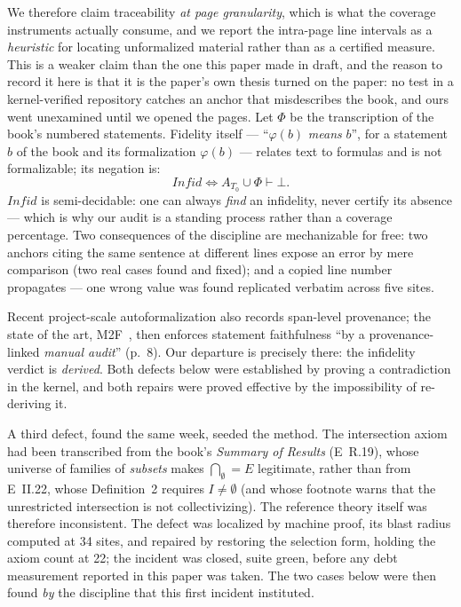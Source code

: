 \documentclass[11pt]{article}
\theoremstyle{remark}\newtheorem{example}{Example}
\begin{document}
We therefore claim traceability \emph{at page granularity}, which is what the coverage
instruments actually consume, and we report the intra-page line intervals as a
\emph{heuristic} for locating unformalized material rather than as a certified measure.
This is a weaker claim than the one this paper made in draft, and the reason to record
it here is that it is the paper's own thesis turned on the paper: no test in a
kernel-verified repository catches an anchor that misdescribes the book, and ours went
unexamined until we opened the pages. Let
$\Phi$ be the transcription of the book's numbered statements. Fidelity itself ---
``$\varphi(b)$ \emph{means} $b$'', for a statement $b$ of the book and its
formalization $\varphi(b)$ --- relates text to formulas and is not formalizable;
its negation is:
\[
\mathit{Infid} \iff A_{T_0} \cup \Phi \vdash \bot .
\]
$\mathit{Infid}$ is semi-decidable: one can always \emph{find} an infidelity, never
certify its absence --- which is why our audit is a standing process rather than a
coverage percentage. Two consequences of the discipline are mechanizable for free:
two anchors citing the same sentence at different lines expose an error by mere
comparison (two real cases found and fixed); and a copied line number propagates ---
one wrong value was found replicated verbatim across five sites.

Recent project-scale autoformalization also records span-level provenance; the state
of the art, M2F~\cite{m2f2026}, then enforces statement faithfulness ``by a
provenance-linked \emph{manual audit}'' (p.~8). Our departure is precisely there: the
infidelity verdict is \emph{derived}. Both defects below were established by proving a
contradiction in the kernel, and both repairs were proved effective by the
impossibility of re-deriving it.

A third defect, found the same week, seeded the method. The intersection axiom had
been transcribed from the book's \emph{Summary of Results} (E~R.19), whose universe
of families of \emph{subsets} makes $\bigcap_{\emptyset} = E$ legitimate, rather than
from E~II.22, whose Definition~2 requires $I \neq \emptyset$ (and whose footnote warns
that the unrestricted intersection is not collectivizing). The reference theory
itself was therefore inconsistent. The defect was localized by machine
proof, its blast radius computed at 34 sites, and repaired by restoring the selection
form, holding the axiom count at 22; the incident was closed, suite green, before any
debt measurement reported in this paper was taken. The two cases below were then
found \emph{by} the discipline that this first incident instituted.
\end{document}
